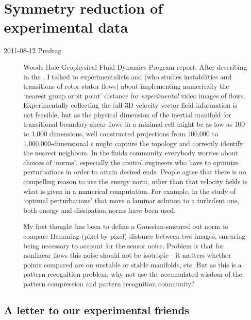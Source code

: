 
\chapter{Symmetry reduction of experimental data}
\label{c-exp}

\begin{description}

\item[2011-08-12 Predrag] Woods Hole Geophysical Fluid Dynamics Program
report: After describing in
the \mslices, I talked to experimentalists
and
(who studies instabilities and transitions of rotor-stator flows) about
implementing numerically the `nearest group orbit point' distance for
\emph{experimental} video images of flows. Experimentally collecting the
full 3D velocity vector field information is not feasible, but as the
physical dimension of the inertial manifold for transitional
boundary-shear flows in a minimal cell might be as low as 100 to 1,000
dimensions, well constructed projections from 100,000 to
1,000,000-dimensional \statesp s might capture the topology and correctly
identify the nearest neighbors. In the fluids community everybody worries
about choices of `norms', especially the control engineers who have to
optimize perturbations in order to attain desired ends. People agree that
there is no compelling reason to use the energy norm, other than that
velocity fields is what is given in a numerical computation. For example,
in the study of `optimal perturbations' that move a laminar solution to a
turbulent one, both energy and dissipation
norms have been used.

My first thought has been to define a Gaussian-smeared out norm to
compare Hamming (pixel by pixel) distance between two images, smearing
being necessary to account for the sensor noise. Problem is that for
nonlinear flows this noise should not be isotropic
- it matters whether points compared are on unstable or stable manifolds,
etc. But as this is a pattern recognition problem, why not use the
accumulated wisdom of the pattern compression and pattern recognition
community?

\end{description}

\section{A letter to our experimental friends}

